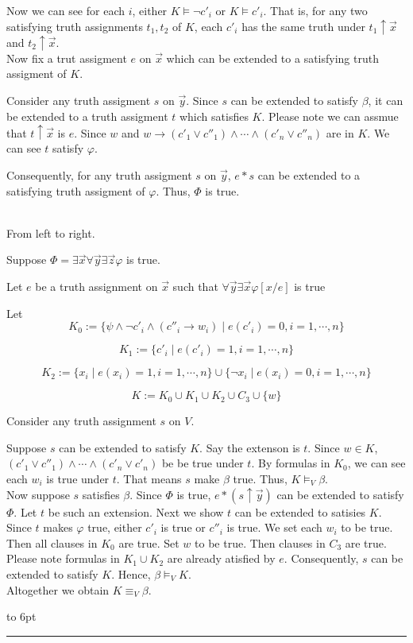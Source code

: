 \documentclass[12pt]{article}
\newenvironment{proof}{\parindent=0pt{\bf Proof: }}{
   \hspace*{\fill}\hbox to 6pt{\leaders\hrule width 6pt height 6pt\hfill}\par}
\begin{document}
\begin{proof}
Now we can see for each $i$, either $K\models \neg c'_i$ or $K\models c'_i$.
That is, for any two satisfying truth assignments $t_1, t_2$ of $K$, each $c'_i$ has the same truth under $t_1\uparrow \vec{x}$ and $t_2\uparrow\vec{x}$.  \\





Now fix a trut assigment $e$ on $\vec{x}$ which can be extended to a satisfying truth assigment of $K$.

Consider any truth assigment $s$ on $\vec{y}$. Since $s$ can be extended to satisfy $\beta$, it can be extended to a truth assigment $t$ which satisfies $K$. Please note we can assmue that $t\uparrow\vec{x}$ is $e$.
Since $w$ and $w\rightarrow (c'_1\vee c''_1)\wedge\cdots\wedge (c'_n\vee c''_n)$ are in $K$. We can see $t$ satisfy $\varphi$.

Consequently, for any truth assigment $s$ on $\vec{y}$, $e*s$ can be extended to a satisfying truth assigment of $\varphi$. Thus, $\Phi$ is true.


\ \\

{\color{red} From left to right}.\color{black}


Suppose $\Phi=\exists\vec{x}\forall\vec{y}\exists\vec{z}\varphi$ is true.

Let $e$ be a truth assignment on $\vec{x}$ such that $\forall\vec{y}\exists\vec{x}\varphi[x/e]$ is true


Let $$K_0:=\{\psi\wedge \neg c'_i\wedge (c''_i\rightarrow w_i)\mid e(c'_i)=0, i=1,\cdots,n\}$$

$$K_1:=\{c'_i\mid e(c'_i)=1, i=1,\cdots,n\}$$

$$K_2:=\{x_i\mid e(x_i)=1, i=1,\cdots, n\}\cup\{\neg x_i\mid e(x_i)=0, i=1,\cdots,n\}$$

$$K:=K_0\cup K_1\cup K_2\cup C_3\cup\{w\}$$

Consider any truth assignment $s$ on $V$.

Suppose $s$ can be extended to satisfy $K$. Say the extenson is $t$. Since $w\in K$, $(c'_1\vee c''_1)\wedge\cdots\wedge(c'_n\vee c'_n)$ be be true under $t$. By formulas in $K_0$, we can see each $w_i$ is true under $t$. That means $s$ make $\beta$ true. Thus, $K\models_V\beta$. \\

Now suppose $s$ satisfies $\beta$. Since $\Phi$ is true, $e*(s\uparrow\vec{y})$ can  be extended to satisfy $\Phi$. Let $t$ be such an extension. Next we show $t$ can be extended to satisies $K$. Since $t$ makes $\varphi$ true, either $c'_i$ is true or $c''_i$ is true. We set each $w_i$ to be true. Then all clauses in $K_0$ are true. Set $w$ to be true. Then clauses in $C_3$ are true. Please note formulas in $K_1\cup K_2$ are already atisfied by $e$. Consequently, $s$ can be extended to satisfy $K$.
Hence, $\beta\models_V K$.\\

Altogether we obtain $K\equiv_V \beta$.
\end{proof}
\end{document}
